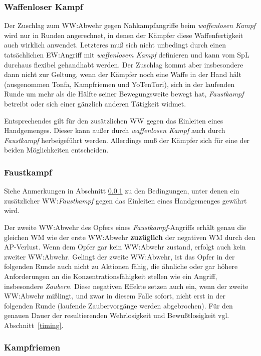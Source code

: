 \documentclass[10pt,a4paper,germanpar]{article}
\begin{document}
\subsubsection{Waffenloser Kampf}
\label{wlk}

Der Zuschlag zum WW:Abwehr gegen Nahkampfangriffe beim
\emph{waffenlosen Kampf} wird nur in Runden angerechnet, in denen der
Kämpfer diese Waffenfertigkeit auch wirklich anwendet. Letzteres muß
sich nicht unbedingt durch einen tatsächlichen EW:Angriff mit
\emph{waffenlosem Kampf} definieren und kann vom SpL durchaus flexibel
gehandhabt werden. Der Zuschlag kommt aber insbesondere dann nicht zur
Geltung, wenn der Kämpfer noch eine Waffe in der Hand hält
(ausgenommen Tonfa, Kampfriemen und YoTenTori), sich in der laufenden
Runde um mehr als die Hälfte seiner Bewegungsweite bewegt hat,
\emph{Faustkampf} betreibt oder sich einer gänzlich anderen Tätigkeit
widmet.

Entsprechendes gilt für den zusätzlichen WW gegen das Einleiten eines
Handgemenges. Dieser kann außer durch \emph{waffenlosen Kampf} auch
durch \emph{Faustkampf} herbeigeführt werden. Allerdings muß der
Kämpfer sich für eine der beiden Möglichkeiten entscheiden.

\subsubsection{Faustkampf}

Siehe Anmerkungen in Abschnitt \ref{wlk} zu den Bedingungen, unter
denen ein zusätzlicher WW:\emph{Faustkampf} gegen das Einleiten eines
Handgemenges gewährt wird.

Der zweite WW:Abwehr des Opfers eines \emph{Faustkampf}-Angriffs
erhält genau die gleichen WM wie der erste WW:Abwehr
\textbf{zuzüglich} der negativen WM durch den AP-Verlust. Wenn dem
Opfer gar kein WW:Abwehr zustand, erfolgt auch kein zweiter
WW:Abwehr. Gelingt der zweite WW:Abwehr, ist das Opfer in der
folgenden Runde auch nicht zu Aktionen fähig, die ähnliche oder gar
höhere Anforderungen an die Konzentrationsfähigkeit stellen wie ein
Angriff, insbesondere \emph{Zaubern}. Diese negativen Effekte setzen
auch ein, wenn der zweite WW:Abwehr mißlingt, und zwar in diesem Falle
sofort, nicht erst in der folgenden Runde (laufende Zaubervorgänge
werden abgebrochen). Für den genauen Dauer der resultierenden
Wehrlosigkeit und Bewußtlosigkeit vgl. Abschnitt~\ref{timing}.

\subsubsection{Kampfriemen}
\end{document}
